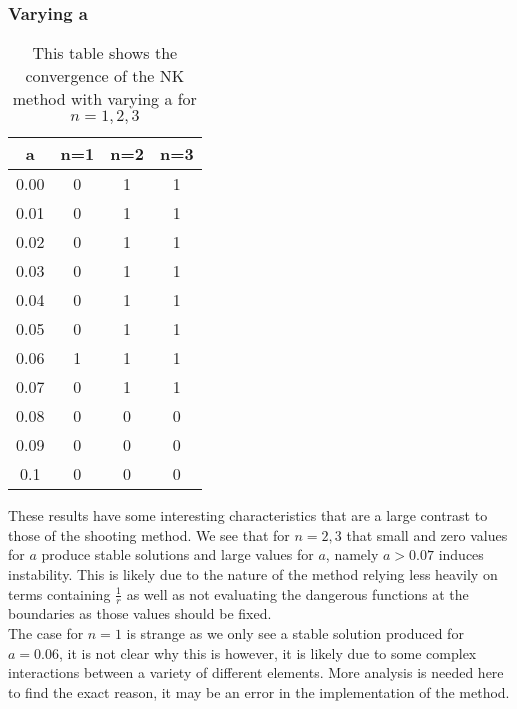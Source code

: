 \documentclass{article}
\begin{document}
\subsubsection{Varying a}
\begin{table}[H]
\centering
\begin{tabular}{|c|c|c|c|}
\hline
a & n=1  & n=2 & n=3 \\
\hline
0.00 & 0 & 1 & 1\\
0.01 & 0 & 1 & 1\\
0.02 & 0 & 1 & 1\\
0.03 & 0 & 1 & 1\\
0.04 & 0 & 1 & 1\\
0.05 & 0 & 1 & 1\\
0.06 & 1 & 1 & 1\\
0.07 & 0 & 1 & 1\\
0.08 & 0 & 0 & 0\\
0.09 & 0 & 0 & 0\\
0.1 & 0 & 0 & 0\\
\hline
\end{tabular}
\caption{This table shows the convergence of the NK method with varying a for $n=1,2,3$}
\end{table}
These results have some interesting characteristics that are a large contrast to those of the shooting method. We see that for $n=2,3$ that small and zero values for $a$ produce stable solutions and large values for $a$, namely $a>0.07$ induces instability. This is likely due to the nature of the method relying less heavily on terms containing $\frac{1}{r}$ as well as not evaluating the dangerous functions at the boundaries as those values should be fixed. \\
The case for $n=1$ is strange as we only see a stable solution produced for $a=0.06$, it is not clear why this is however, it is likely due to some complex interactions between a variety of different elements. More analysis is needed here to find the exact reason, it may be an error in the implementation of the method. 
\end{document}
